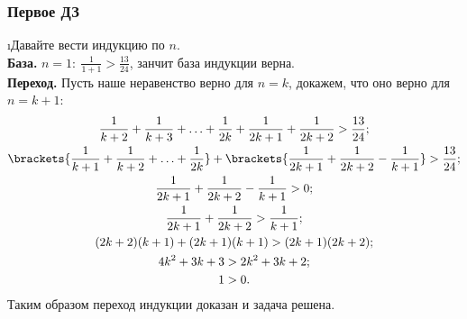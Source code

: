 \subsubsection{Первое ДЗ}

\i Давайте вести индукцию по $n$.\\
\textbf{База.} $n=1: \ \frac{1}{1+1} > \frac{13}{24}$, занчит база индукции верна.\\
\textbf{Переход.} Пусть наше неравенство верно для $n = k$, докажем, что оно верно для $n = k + 1$:
\begin{gather*}
    \frac{1}{k+2} + \frac{1}{k+3} + \ldots + \frac{1}{2k} + \frac{1}{2k+1} + \frac{1}{2k+2} > \frac{13}{24};\\
    \brackets{\frac{1}{k+1} + \frac{1}{k+2} + \ldots + \frac{1}{2k}} + \brackets{\frac{1}{2k+1} + \frac{1}{2k+2} - \frac{1}{k+1}} > \frac{13}{24};\\
    \frac{1}{2k+1} + \frac{1}{2k+2} - \frac{1}{k+1} > 0;\\
    \frac{1}{2k+1} + \frac{1}{2k+2} > \frac{1}{k+1};\\
    (2k+2)(k+1) + (2k+1)(k+1) > (2k+1)(2k+2);\\
    4k^2 + 3k + 3 > 2k^2 + 3k + 2;\\
    1 > 0.
\end{gather*}
Таким образом переход индукции доказан и задача решена.

